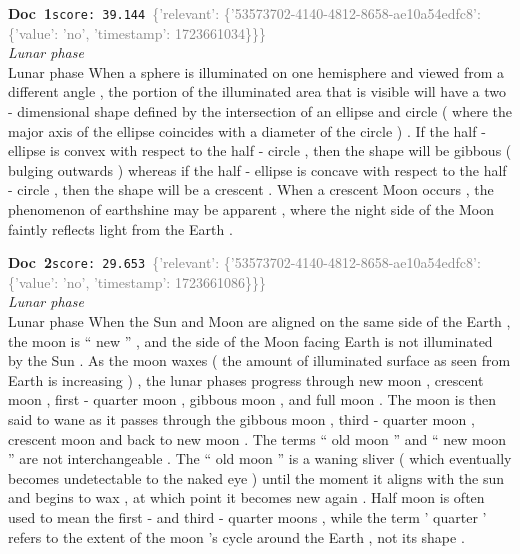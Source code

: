 \documentclass[a4paper,11pt]{article}
\begin{document}
\begin{docenv}
{\footnotesize\textcolor{doccolor}{\textbf{Doc~1}}}\hfill{\tiny\texttt{score:~39.144}}\ {\tiny\textcolor{gray}{\{'relevant': \{'53573702-4140-4812-8658-ae10a54edfc8': \{'value': 'no', 'timestamp': 1723661034\}\}\}}}\\[3pt]
{\small\textit{Lunar phase}}\\[2pt]
\vspace{2pt}
{\footnotesize Lunar phase
When a sphere is illuminated on one hemisphere and viewed from a different angle , the portion of the illuminated area that is visible will have a two - dimensional shape defined by the intersection of an ellipse and circle ( where the major axis of the ellipse coincides with a diameter of the circle ) . If the half - ellipse is convex with respect to the half - circle , then the shape will be gibbous ( bulging outwards ) whereas if the half - ellipse is concave with respect to the half - circle , then the shape will be a crescent . When a crescent Moon occurs , the phenomenon of earthshine may be apparent , where the night side of the Moon faintly reflects light from the Earth .}
\end{docenv}
\begin{docenv}
{\footnotesize\textcolor{doccolor}{\textbf{Doc~2}}}\hfill{\tiny\texttt{score:~29.653}}\ {\tiny\textcolor{gray}{\{'relevant': \{'53573702-4140-4812-8658-ae10a54edfc8': \{'value': 'no', 'timestamp': 1723661086\}\}\}}}\\[3pt]
{\small\textit{Lunar phase}}\\[2pt]
\vspace{2pt}
{\footnotesize Lunar phase
When the Sun and Moon are aligned on the same side of the Earth , the moon is `` new '' , and the side of the Moon facing Earth is not illuminated by the Sun . As the moon waxes ( the amount of illuminated surface as seen from Earth is increasing ) , the lunar phases progress through new moon , crescent moon , first - quarter moon , gibbous moon , and full moon . The moon is then said to wane as it passes through the gibbous moon , third - quarter moon , crescent moon and back to new moon . The terms `` old moon '' and `` new moon '' are not interchangeable . The `` old moon '' is a waning sliver ( which eventually becomes undetectable to the naked eye ) until the moment it aligns with the sun and begins to wax , at which point it becomes new again . Half moon is often used to mean the first - and third - quarter moons , while the term ' quarter ' refers to the extent of the moon 's cycle around the Earth , not its shape .}
\end{docenv}
\end{document}
